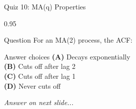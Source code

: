 \documentclass[9pt, aspectratio=169, t]{beamer}
\begin{document}
\begin{frame}{Quiz 10: MA(q) Properties}
    \begin{cminipage}{0.95\textwidth}
    \begin{alertblock}{Question}
        For an MA(2) process, the ACF:
    \end{alertblock}

    \vspace{0.4cm}

    \begin{block}{Answer choices}
        \textcolor{MainBlue}{\textbf{(A)}} Decays exponentially\\[3pt]
        \textcolor{MainBlue}{\textbf{(B)}} Cuts off after lag 2\\[3pt]
        \textcolor{MainBlue}{\textbf{(C)}} Cuts off after lag 1\\[3pt]
        \textcolor{MainBlue}{\textbf{(D)}} Never cuts off
    \end{block}

    \vspace{0.5cm}

    \begin{center}
        \textit{Answer on next slide...}
    \end{center}
    \end{cminipage}
\end{frame}
\end{document}
